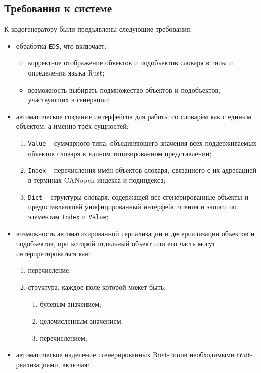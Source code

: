 \documentclass[a4paper,12pt]{article}
\begin{document}
\subsection{Требования к системе}

К кодогенератору были предъявлены следующие требования:
\begin{itemize}
  \item обработка \texttt{EDS}, что включает:
  \begin{itemize}
    \item корректное отображение объектов и подобъектов словаря в типы и определения языка Rust;
    \item возможность выбирать подмножество объектов и подобъектов, участвующих в генерации;
  \end{itemize}
  \item автоматическое создание интерфейсов для работы со словарём как с единым объектом, а именно трёх сущностей:
  \begin{enumerate}
    \item \texttt{Value} -- суммарного типа, объединяющего значения всех поддерживаемых объектов словаря в едином типизированном представлении;
    \item \texttt{Index} -- перечисления имён объектов словаря, связанного с их адресацией в терминах CANopen-индекса и подиндекса;
    \item \texttt{Dict} -- структуры словаря, содержащей все сгенерированные объекты и предоставляющей унифицированный интерфейс чтения и записи по элементам \texttt{Index} и \texttt{Value};
  \end{enumerate}
  \item возможность автоматизированной сериализации и десериализации объектов и подобъектов,
  при которой отдельный объект или его часть могут интерпретироваться как:
  \begin{enumerate}
    \item перечисление;
    \item структура, каждое поле которой может быть:
    \begin{enumerate}
      \item булевым значением;
      \item целочисленным значением;
      \item перечислением;
    \end{enumerate}
  \end{enumerate}
  \item автоматическое наделение сгенерированных Rust-типов необходимыми trait-реализациями, включая:

\end{itemize}
\end{document}
